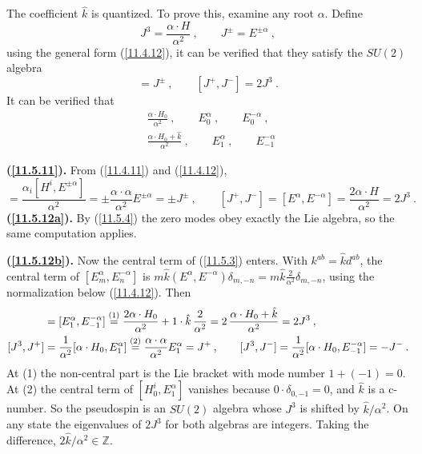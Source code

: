 The coefficient $\hat{k}$ is quantized. To prove this, examine any root $\alpha$. Define
\begin{equation}
	J^{3} =\frac{\alpha\cdot H}{\alpha^{2}}\:, \qquad J^{\pm}=E^{\pm\alpha} \:, \label{11.5.10}
\end{equation}
using the general form (\ref{11.4.12}), it can be verified that they satisfy the $SU(2)$ algebra
\begin{equation}
	[J^{3},J^{\pm}]=J^{\pm}\:, \qquad [J^{+},J^{-}]=2J^{3} \:. \label{11.5.11}
\end{equation}
It can be verified that
\begin{subequations}
	\begin{align}
		&\frac{\alpha\cdot H_{0}}{\alpha^{2}}\:, \qquad E_{0}^{\alpha}\:,\qquad E_{0}^{-\alpha} \:, \label{11.5.12a}\\
		&\frac{\alpha\cdot H_{0}+\hat{k}}{\alpha^{2}}\:, \qquad E_{1}^{\alpha}\:, \qquad E_{-1}^{-\alpha} \:\label{11.5.12b}
	\end{align} \label{15.5.12}
\end{subequations}
\begin{tcolorbox}[breakable]
	\begin{remark}
		\textbf{(\ref{11.5.11}).} From (\ref{11.4.11}) and (\ref{11.4.12}),
		\begin{equation*}
			[J^{3},J^{\pm}]=\frac{\alpha_{i}[H^{i},E^{\pm\alpha}]}{\alpha^{2}}=\pm\frac{\alpha\cdot\alpha}{\alpha^{2}}E^{\pm\alpha}=\pm J^{\pm}\:,\qquad
			[J^{+},J^{-}]=[E^{\alpha},E^{-\alpha}]=\frac{2\alpha\cdot H}{\alpha^{2}}=2J^{3}\:.
		\end{equation*}
		\textbf{(\ref{11.5.12a}).} By (\ref{11.5.4}) the zero modes obey exactly the Lie algebra, so the same computation applies.

		\textbf{(\ref{11.5.12b}).} Now the central term of (\ref{11.5.3}) enters. With $k^{ab}=\hat{k}d^{ab}$, the central term of $[E^{\alpha}_{m},E^{-\alpha}_{n}]$ is $m\hat{k}(E^{\alpha},E^{-\alpha})\delta_{m,-n}=m\hat{k}\frac{2}{\alpha^{2}}\delta_{m,-n}$, using the normalization below (\ref{11.4.12}). Then
		\begin{align*}
			[J^{+},J^{-}]&=[E^{\alpha}_{1},E^{-\alpha}_{-1}]\eqs{1}\frac{2\alpha\cdot H_{0}}{\alpha^{2}}+1\cdot\hat{k}\,\frac{2}{\alpha^{2}}=2\,\frac{\alpha\cdot H_{0}+\hat{k}}{\alpha^{2}}=2J^{3}\:,\\
			[J^{3},J^{+}]&=\frac{1}{\alpha^{2}}[\alpha\cdot H_{0},E^{\alpha}_{1}]\eqs{2}\frac{\alpha\cdot\alpha}{\alpha^{2}}E^{\alpha}_{1}=J^{+}\:,\qquad
			[J^{3},J^{-}]=\frac{1}{\alpha^{2}}[\alpha\cdot H_{0},E^{-\alpha}_{-1}]=-J^{-}\:.
		\end{align*}
		At (1) the non-central part is the Lie bracket with mode number $1+(-1)=0$. At (2) the central term of $[H^{i}_{0},E^{\alpha}_{1}]$ vanishes because $0\cdot\delta_{0,-1}=0$, and $\hat{k}$ is a c-number. So the pseudospin is an $SU(2)$ algebra whose $J^{3}$ is shifted by $\hat{k}/\alpha^{2}$. On any state the eigenvalues of $2J^{3}$ for both algebras are integers. Taking the difference, $2\hat{k}/\alpha^{2}\in\mathds{Z}$.
	\end{remark}
\end{tcolorbox}
